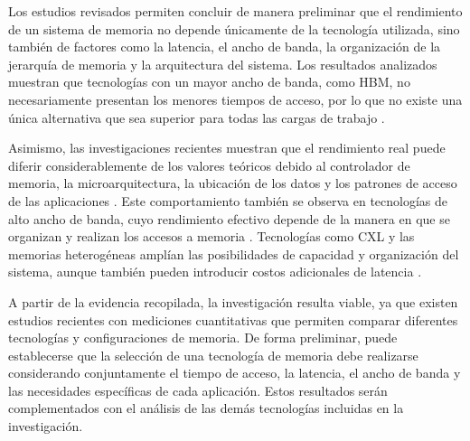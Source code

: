 
Los estudios revisados permiten concluir de manera preliminar que el
rendimiento de un sistema de memoria no depende únicamente de la tecnología
utilizada, sino también de factores como la latencia, el ancho de banda, la
organización de la jerarquía de memoria y la arquitectura del sistema. Los
resultados analizados muestran que tecnologías con un mayor ancho de banda,
como HBM, no necesariamente presentan los menores tiempos de acceso, por lo
que no existe una única alternativa que sea superior para todas las cargas de
trabajo \cite{ibeid2025aurora,esmailidokht2024mess}.

Asimismo, las investigaciones recientes muestran que el rendimiento real puede
diferir considerablemente de los valores teóricos debido al controlador de
memoria, la microarquitectura, la ubicación de los datos y los patrones de
acceso de las aplicaciones \cite{eyerman2022dram,velten2022memory}. Este
comportamiento también se observa en tecnologías de alto ancho de banda, cuyo
rendimiento efectivo depende de la manera en que se organizan y realizan los
accesos a memoria \cite{huang2022shuhai}. Tecnologías como CXL y las memorias
heterogéneas amplían las posibilidades de capacidad y organización del sistema,
aunque también pueden introducir costos adicionales de latencia
\cite{wang2024hitchhiker,lurbe2023controlador}.

A partir de la evidencia recopilada, la investigación resulta viable, ya que
existen estudios recientes con mediciones cuantitativas que permiten comparar
diferentes tecnologías y configuraciones de memoria. De forma preliminar, puede
establecerse que la selección de una tecnología de memoria debe realizarse
considerando conjuntamente el tiempo de acceso, la latencia, el ancho de banda
y las necesidades específicas de cada aplicación. Estos resultados serán
complementados con el análisis de las demás tecnologías incluidas en la
investigación.
